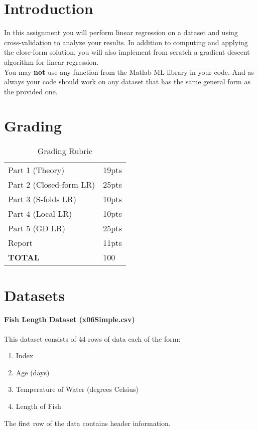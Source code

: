 \documentclass[12pt]{article}
\begin{document}
\maketitle


\section*{Introduction}
In this assignment you will perform linear regression on a dataset and using cross-validation to analyze your results.  In addition to computing and applying the close-form solution, you will also implement from scratch a gradient descent algorithm for linear regression.\\

\noindent
You may \textbf{not} use any function from the Matlab ML library in your code.  And as always your code should work on any dataset that has the same general form as the provided one.

\section*{Grading}
\begin{table}[h]
\begin{center}
\begin{tabular}{|l|l|}
\hline
Part 1 (Theory) & 19pts\\
Part 2 (Closed-form LR) & 25pts\\
Part 3 (S-folds LR) & 10pts\\
Part 4 (Local LR) & 10pts\\
Part 5 (GD LR) & 25pts\\
Report & 11pts\\
\hline
\textbf{TOTAL} & 100 \\
\hline
\end{tabular}
\caption{Grading Rubric}
\end{center}
\end{table}

\newpage
\section*{Datasets}
\paragraph{Fish Length Dataset  (x06Simple.csv)}
This dataset consists of 44 rows of data each of the form:
\begin{enumerate}
\item Index
\item Age (days)
\item Temperature of Water (degrees Celsius)
\item Length of Fish
\end{enumerate}
The first row of the data contains header information.\\
\end{document}
